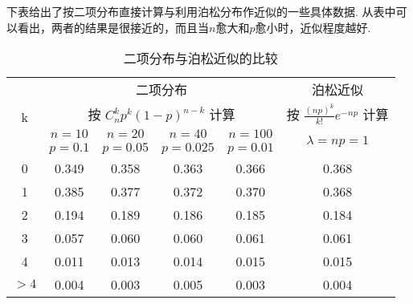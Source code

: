 下表给出了按二项分布直接计算与利用泊松分布作近似的一些具体数据.
从表中可以看出，两者的结果是很接近的，而且当$ n $愈大和$ p $愈小时，近似程度越好.

\begin{table}[htbp]
	\centering
	\caption{二项分布与泊松近似的比较}
	\begin{tabular}{c|c|c|c|c|c}
		\toprule
		\multirow{4}{*}{k}   & \multicolumn{4}{c|}{二项分布}                                                                  & 泊松近似                                  \\
		& \multicolumn{4}{c|}{按 $C_{n}^{k} p^{k}(1-p)^{n-k}$ 计算}                                     & 按 $\frac{(n p)^{k}}{k !} e^{-n p}$ 计算 \\\cline{2-6}
		& $n=10$               & $n=20$               & $n=40$               & $n=100$              & \multirow{2}{*}{$\lambda=n p=1$}      \\
		& $p=0.1$              & $p=0.05$             & $p=0.025$            & $p=0.01$             &                                       \\\midrule
		0                    & 0.349                & 0.358                & 0.363                & 0.366                & 0.368                                 \\
		1                    & 0.385                & 0.377                & 0.372                & 0.370                & 0.368                                 \\
		2                    & 0.194                & 0.189                & 0.186                & 0.185                & 0.184                                 \\
		3                    & 0.057                & 0.060                & 0.060                & 0.061                & 0.061                                 \\
		4                    & 0.011                & 0.013                & 0.014                & 0.015                & 0.015                                 \\
		$>4$                 & 0.004                & 0.003                & 0.005                & 0.003                & 0.004                                 \\\bottomrule           
	\end{tabular}
	\label{tab:2.4.3}
\end{table}

